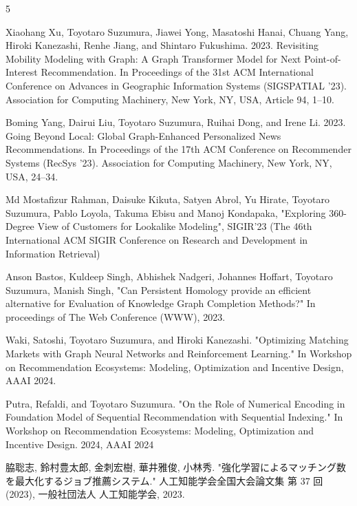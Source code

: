 






\begin{査読付}{5}

Xiaohang Xu, Toyotaro Suzumura, Jiawei Yong, Masatoshi Hanai, Chuang Yang, Hiroki Kanezashi, Renhe Jiang, and Shintaro Fukushima. 2023. Revisiting Mobility Modeling with Graph: A Graph Transformer Model for Next Point-of-Interest Recommendation. In Proceedings of the 31st ACM International Conference on Advances in Geographic Information Systems (SIGSPATIAL '23). Association for Computing Machinery, New York, NY, USA, Article 94, 1–10.

Boming Yang, Dairui Liu, Toyotaro Suzumura, Ruihai Dong, and Irene Li. 2023. Going Beyond Local: Global Graph-Enhanced Personalized News Recommendations. In Proceedings of the 17th ACM Conference on Recommender Systems (RecSys '23). Association for Computing Machinery, New York, NY, USA, 24–34.

Md Mostafizur Rahman, Daisuke Kikuta, Satyen Abrol, Yu Hirate, Toyotaro Suzumura, Pablo Loyola, Takuma Ebisu and Manoj Kondapaka, "Exploring 360-Degree View of Customers for Lookalike Modeling",  SIGIR'23 (The 46th International ACM
SIGIR Conference on Research and Development in Information
Retrieval) 

Anson Bastos, Kuldeep Singh, Abhishek Nadgeri, Johannes Hoffart, Toyotaro Suzumura, Manish Singh,
"Can Persistent Homology provide an efficient alternative for Evaluation of Knowledge Graph Completion Methods?"
In proceedings of The Web Conference (WWW), 2023.

Waki, Satoshi, Toyotaro Suzumura, and Hiroki Kanezashi. "Optimizing Matching Markets with Graph Neural Networks and Reinforcement Learning." In Workshop on Recommendation Ecosystems: Modeling, Optimization and Incentive Design, AAAI 2024.

Putra, Refaldi, and Toyotaro Suzumura. "On the Role of Numerical Encoding in Foundation Model of Sequential Recommendation with Sequential Indexing." In Workshop on Recommendation Ecosystems: Modeling, Optimization and Incentive Design. 2024, AAAI 2024


脇聡志, 鈴村豊太郎, 金刺宏樹, 華井雅俊, 小林秀. "強化学習によるマッチング数を最大化するジョブ推薦システム." 人工知能学会全国大会論文集 第 37 回 (2023), 一般社団法人 人工知能学会, 2023.
\end{査読付}


